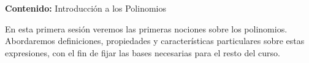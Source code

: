 {\Large \textbf{Contenido:} Introducción a los Polinomios}

En esta primera sesión veremos las primeras nociones sobre los polinomios.
Abordaremos definiciones, propiedades y características particulares sobre estas expresiones, con el fin de fijar las bases necesarias para el resto del curso.